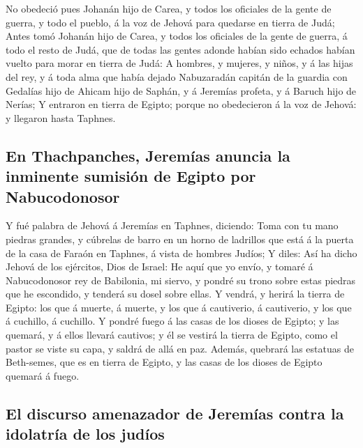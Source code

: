  No obedeció pues Johanán hijo de Carea, y todos los
oficiales de la gente de guerra, y todo el pueblo, á la voz de Jehová
para quedarse en tierra de Judá;  Antes tomó Johanán hijo de
Carea, y todos los oficiales de la gente de guerra, á todo el resto de
Judá, que de todas las gentes adonde habían sido echados habían vuelto
para morar en tierra de Judá:  A hombres, y mujeres, y
niños, y á las hijas del rey, y á toda alma que había dejado Nabuzaradán
capitán de la guardia con Gedalías hijo de Ahicam hijo de Saphán, y á
Jeremías profeta, y á Baruch hijo de Nerías;  Y entraron en
tierra de Egipto; porque no obedecieron á la voz de Jehová: y llegaron
hasta Taphnes.

\hypertarget{en-thachpanches-jeremuxedas-anuncia-la-inminente-sumisiuxf3n-de-egipto-por-nabucodonosor}{%
\subsection{En Thachpanches, Jeremías anuncia la inminente sumisión de
Egipto por
Nabucodonosor}\label{en-thachpanches-jeremuxedas-anuncia-la-inminente-sumisiuxf3n-de-egipto-por-nabucodonosor}}

 Y fué palabra de Jehová á Jeremías en Taphnes, diciendo:
 Toma con tu mano piedras grandes, y cúbrelas de barro en un
horno de ladrillos que está á la puerta de la casa de Faraón en Taphnes,
á vista de hombres Judíos;  Y diles: Así ha dicho Jehová de
los ejércitos, Dios de Israel: He aquí que yo envío, y tomaré á
Nabucodonosor rey de Babilonia, mi siervo, y pondré su trono sobre estas
piedras que he escondido, y tenderá su dosel sobre ellas. 
Y vendrá, y herirá la tierra de Egipto: los que á muerte, á muerte, y
los que á cautiverio, á cautiverio, y los que á cuchillo, á cuchillo.
 Y pondré fuego á las casas de los dioses de Egipto; y las
quemará, y á ellos llevará cautivos; y él se vestirá la tierra de
Egipto, como el pastor se viste su capa, y saldrá de allá en paz.
 Además, quebrará las estatuas de Beth-semes, que es en
tierra de Egipto, y las casas de los dioses de Egipto quemará á fuego.

\hypertarget{el-discurso-amenazador-de-jeremuxedas-contra-la-idolatruxeda-de-los-juduxedos}{%
\subsection{El discurso amenazador de Jeremías contra la idolatría de
los
judíos}\label{el-discurso-amenazador-de-jeremuxedas-contra-la-idolatruxeda-de-los-juduxedos}}

